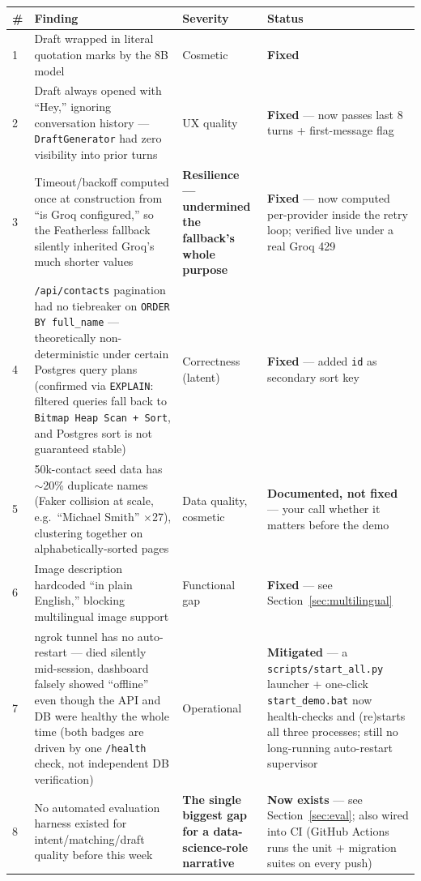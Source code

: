\documentclass[11pt, a4paper]{article}
\newcommand{\good}[1]{\textcolor{good}{\textbf{#1}}}
\newcommand{\warnc}[1]{\textcolor{warn}{\textbf{#1}}}
\newcommand{\badc}[1]{\textcolor{bad}{\textbf{#1}}}
\begin{document}
\begin{longtable}{@{}p{0.3cm}p{6.5cm}p{2.8cm}p{3.5cm}@{}}
\toprule
\# & Finding & Severity & Status \\
\midrule
\endhead
1 & Draft wrapped in literal quotation marks by the 8B model & Cosmetic & \good{Fixed} \\
2 & Draft always opened with ``Hey,'' ignoring conversation history --- \texttt{DraftGenerator} had zero visibility into prior turns & UX quality & \good{Fixed} --- now passes last 8 turns + first-message flag \\
3 & Timeout/backoff computed once at construction from ``is Groq configured,'' so the Featherless fallback silently inherited Groq's much shorter values & \badc{Resilience --- undermined the fallback's whole purpose} & \good{Fixed} --- now computed per-provider inside the retry loop; verified live under a real Groq 429 \\
4 & \texttt{/api/contacts} pagination had no tiebreaker on \texttt{ORDER BY full\_name} --- theoretically non-deterministic under certain Postgres query plans (confirmed via \texttt{EXPLAIN}: filtered queries fall back to \texttt{Bitmap Heap Scan + Sort}, and Postgres sort is not guaranteed stable) & Correctness (latent) & \good{Fixed} --- added \texttt{id} as secondary sort key \\
5 & 50k-contact seed data has $\sim$20\% duplicate names (Faker collision at scale, e.g.\ ``Michael Smith'' $\times$27), clustering together on alphabetically-sorted pages & Data quality, cosmetic & \warnc{Documented, not fixed} --- your call whether it matters before the demo \\
6 & Image description hardcoded ``in plain English,'' blocking multilingual image support & Functional gap & \good{Fixed} --- see Section~\ref{sec:multilingual} \\
7 & ngrok tunnel has no auto-restart --- died silently mid-session, dashboard falsely showed ``offline'' even though the API and DB were healthy the whole time (both badges are driven by one \texttt{/health} check, not independent DB verification) & Operational & \good{Mitigated} --- a \texttt{scripts/start\_all.py} launcher + one-click \texttt{start\_demo.bat} now health-checks and (re)starts all three processes; still no long-running auto-restart supervisor \\
8 & No automated evaluation harness existed for intent/matching/draft quality before this week & \badc{The single biggest gap for a data-science-role narrative} & \good{Now exists} --- see Section~\ref{sec:eval}; also wired into CI (GitHub Actions runs the unit + migration suites on every push) \\

\end{longtable}
\end{document}
